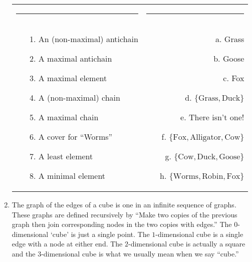 \begin{enumerate}
\begin{tabular}{lr}
\rule{2.3in}{0pt} & \rule{2.3in}{0pt} \\
\begin{minipage}[b]{.4\textwidth}
\begin{enumerate}
\item[1.] An (non-maximal) antichain
\item[2.] A maximal antichain
\item[3.] A maximal element
\item[4.] A (non-maximal) chain
\item[5.] A maximal chain
\item[6.] A cover for ``Worms''
\item[7.] A least element
\item[8.] A minimal element
\end{enumerate}
\end{minipage} 
 & 
\begin{minipage}[b]{.4\textwidth}
\begin{enumerate}
\item[a.] Grass 
\item[b.] Goose
\item[c.] Fox
\item[d.] $\{ \mbox{Grass}, \mbox{Duck} \}$
\item[e.] There isn't one!
\item[f.] $\{ \mbox{Fox}, \mbox{Alligator}, \mbox{Cow} \}$
\item[g.] $\{ \mbox{Cow}, \mbox{Duck},  \mbox{Goose} \}$
\item[h.] $\{ \mbox{Worms}, \mbox{Robin}, \mbox{Fox} \}$
\end{enumerate} 
\end{minipage} \\
\end{tabular}

\wbvfill

\workbookpagebreak

\item The graph of the edges of a cube is one in an infinite sequence of 
graphs.  These graphs are defined 
recursively by ``Make two copies of the previous graph then join 
corresponding nodes in the two copies with edges.''  The $0$-dimensional
`cube' is just a single point.  The $1$-dimensional cube is a single edge
with a node at either end.  The $2$-dimensional cube is actually a square
and the $3$-dimensional cube is what we usually mean when we say ``cube.''


\end{enumerate}
